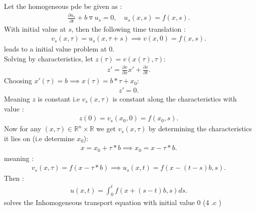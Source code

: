 \begin{solution}
  Let the homogeneous pde be given as : 
  \begin{align*}
    \frac{\partial u_s}{\partial t}  + b \triangledown u_s  = 0  ,\quad u_s(x,s) =f(x,s) 
  .\end{align*}
  With initial value at $s$, then the following time translation : 
  \begin{align*}
    v_s(x,\tau ) = u_s(x,\tau +s) \implies v(x,0) = f(x,s)
  .\end{align*}
  leads to a initial value problem at 0. \\
  Solving by characteristics, let $z(\tau ) = v(x(\tau ),\tau )$:
  \begin{align*}
    z' = \frac{\partial v}{\partial x} x' + \frac{\partial v}{\partial t} 
  .\end{align*}
  Choosing $x'(\tau ) = b \implies x(\tau ) = b*\tau +x_0$: 
  \begin{align*}
    z' = 0
  .\end{align*}
  Meaning $z$ is constant i.e $v_s(x,\tau )$ is constant along the characteristics with value :
  \begin{align*}
    z(0) = v_s(x_0,0) = f(x_0,s)
  .\end{align*}
  Now for any $(x,\tau ) \in  \mathbb{R}^{n}\times \mathbb{R} $ we get $v_s(x,\tau )$ by determining the characteristics it lies on (i.e determine $x_0$):
  \begin{align*}
    x = x_0 + \tau *b \implies x_0 = x - \tau *b
  .\end{align*}
  meaning : 
  \begin{align*}
    v_s(x,\tau ) = f(x-\tau *b)  \implies u_s(x,t) = f(x-(t-s)b,s)
  .\end{align*}
  Then : 
  \begin{align*}
    u(x,t) = \int_0^t f(x+(s-t)b,s) ds 
  .\end{align*}
  solves the Inhomogeneous transport equation with initial value 0 (4 .c )
\end{solution}

